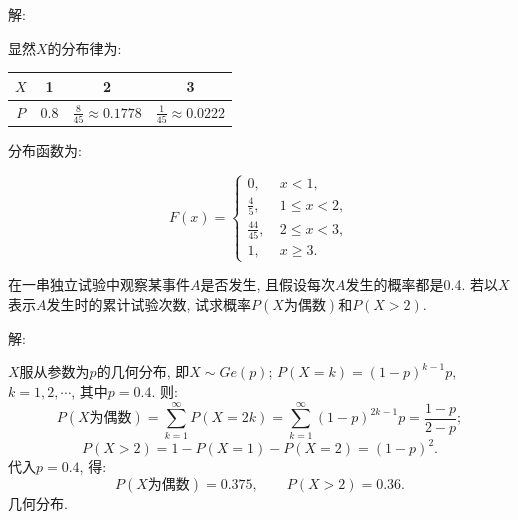 \documentclass[standard]{ExBook}
\begin{document}
\begin{qitems}
    \begin{bbox}
解: 

显然$X$的分布律为:
\begin{center}
\begin{tabular}{c|c|c|c}
    \hline
    $X$ & 1 & 2 & 3 \\
    \hline
    $P$ & 0.8 & $\frac{8}{45}\approx0.1778$ & $\frac{1}{45}\approx0.0222$\\
    \hline
\end{tabular}
\end{center}
分布函数为:
\vspace{-2em}
\begin{center}
\begin{equation}
    F(x)=
    \left\{
    \begin{array}{cl}
        \nonumber
        0,\ &x < 1,\\
        \frac{4}{5},\ &1 \leq x < 2,\\
        \frac{44}{45},\ &2 \leq x < 3,\\
        1,\ &x \geq 3.
    \end{array}
    \right.
\end{equation}
\end{center}
    \end{bbox}

\vspace{-5em}

    \begin{bbox}
    \begin{shaded}
        \qitem
在一串独立试验中观察某事件$A$是否发生, 且假设每次$A$发生的概率都是0.4. 若以$X$表示$A$发生时的累计试验次数, 试求概率$P(X\text{为偶数})$和$P(X > 2)$.
    \end{shaded}
    \end{bbox}

\vspace{-5em}

    \begin{bbox}
解: 

$X$服从参数为$p$的几何分布, 即$X\sim Ge(p)$; $P(X=k)=(1-p)^{k-1}p$, $k=1,2,\cdots$, 其中$p=0.4$. 则:
$$P(X\text{为偶数})=\sum\limits_{k=1}^{\infty}P(X=2k)=\sum\limits_{k=1}^{\infty}(1-p)^{2k-1}p=\frac{1-p}{2-p};$$
$$P(X > 2)=1-P(X=1)-P(X=2)=(1-p)^2.$$
代入$p=0.4$, 得:
$$P(X\text{为偶数})=0.375,\qquad P(X > 2)=0.36.$$
\textcolor{themeColor}{\selectfont {} 几何分布.}
    \end{bbox}

\vspace{-5em}


\end{qitems}
\end{document}
